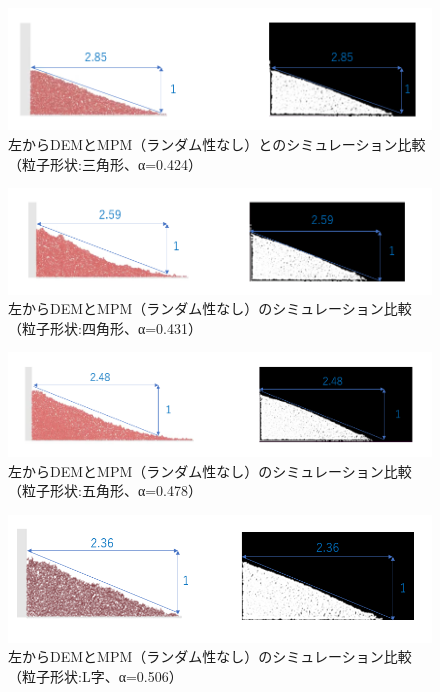 \documentclass[12pt]{ltjsarticle}
\begin{document}
\begin{figure}[htbp]
  \centering
  \includegraphics*[keepaspectratio, scale=0.65]{triangle_ansoku.PNG}
  \caption{左からDEMとMPM（ランダム性なし）とのシミュレーション比較（粒子形状:三角形、α=0.424）}
  \label{hikaku_ansoku_triangle}
\end{figure}


\begin{figure}[htbp]
  \centering
  \includegraphics*[keepaspectratio, scale=0.6]{square_ansoku.PNG}
  \caption{左からDEMとMPM（ランダム性なし）のシミュレーション比較（粒子形状:四角形、α=0.431）}
  \label{hikaku_ansoku_square}
\end{figure}

\begin{figure}[htbp]
  \centering
  \includegraphics*[keepaspectratio, scale=0.6]{pentagon_ansoku.PNG}
  \caption{左からDEMとMPM（ランダム性なし）のシミュレーション比較（粒子形状:五角形、α=0.478）}
  \label{hikaku_ansoku_pentagon}
\end{figure}

\clearpage

\begin{figure}[htbp]
  \centering
  \includegraphics*[keepaspectratio, scale=0.6]{L_ansoku.PNG}
  \caption{左からDEMとMPM（ランダム性なし）のシミュレーション比較（粒子形状:L字、α=0.506）}
  \label{hikaku_ansoku_L}
\end{figure}
\end{document}
